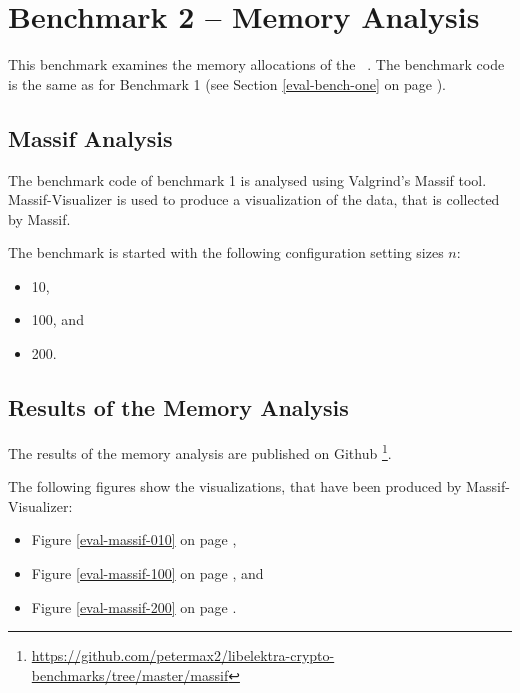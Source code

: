 \section{Benchmark 2 -- Memory Analysis}
\label{eval-bench-two}

This benchmark examines the memory allocations of the \crypto ~.
The benchmark code is the same as for Benchmark 1 (see Section \ref{eval-bench-one} on page \pageref{eval-bench-one}).

	\subsection{Massif Analysis}

The benchmark code of benchmark 1 is analysed using Valgrind's Massif tool.
Massif-Visualizer is used to produce a visualization of the data, that is collected by Massif.

The benchmark is started with the following configuration setting sizes $n$:

\begin{itemize}
\item 10,
\item 100, and
\item 200.
\end{itemize}

	\subsection{Results of the Memory Analysis}

The results of the memory analysis  are published on Github
\footnote{\url{https://github.com/petermax2/libelektra-crypto-benchmarks/tree/master/massif}}.

The following figures show the visualizations, that have been produced by Massif-Visualizer:

\begin{itemize}
\item Figure \ref{eval-massif-010} on page \pageref{eval-massif-010},
\item Figure \ref{eval-massif-100} on page \pageref{eval-massif-100}, and
\item Figure \ref{eval-massif-200} on page \pageref{eval-massif-200}.
\end{itemize}


